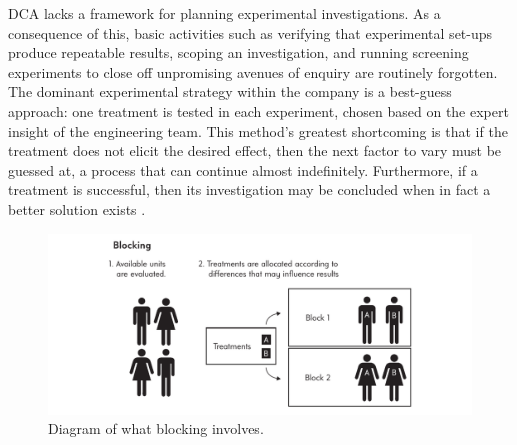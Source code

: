 \documentclass[11pt,a4paper,article]{memoir} %
\begin{document}
DCA lacks a framework for planning experimental investigations. As a consequence of this, basic activities such as verifying that experimental set-ups produce repeatable results, scoping an investigation, and running screening experiments to close off unpromising avenues of enquiry are routinely forgotten. The dominant experimental strategy within the company is a best-guess approach: one treatment is tested in each experiment, chosen based on the expert insight of the engineering team. This method's greatest shortcoming is that if the treatment does not elicit the desired effect, then the next factor to vary must be guessed at, a process that can continue almost indefinitely. Furthermore, if a treatment is successful, then its investigation may be concluded when in fact a better solution exists \cite{montgomery2000design}.
\par
\begin{figure}
\includegraphics[width=\textwidth]{Blocking.pdf}
\caption{Diagram of what blocking involves.}
\label{fig:blocking}
\end{figure}
\par
\end{document}
